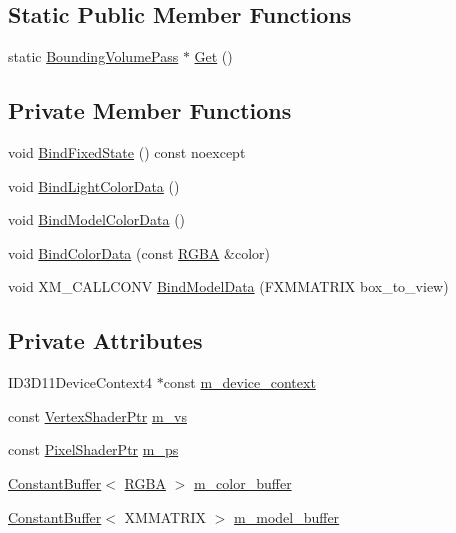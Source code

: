 \subsection*{Static Public Member Functions}
\begin{DoxyCompactItemize}
\item 
static \hyperlink{classmage_1_1_bounding_volume_pass}{Bounding\+Volume\+Pass} $\ast$ \hyperlink{classmage_1_1_bounding_volume_pass_a254c44c1c9f18967c9d6cdb6e53d3bcd}{Get} ()
\end{DoxyCompactItemize}
\subsection*{Private Member Functions}
\begin{DoxyCompactItemize}
\item 
void \hyperlink{classmage_1_1_bounding_volume_pass_ab38a107beb5481e923526d51e9fdfbe2}{Bind\+Fixed\+State} () const noexcept
\item 
void \hyperlink{classmage_1_1_bounding_volume_pass_a9dcca637d98ea8335777094d3d994f5c}{Bind\+Light\+Color\+Data} ()
\item 
void \hyperlink{classmage_1_1_bounding_volume_pass_af4591758a8dfa7cd19a0f87a0273e470}{Bind\+Model\+Color\+Data} ()
\item 
void \hyperlink{classmage_1_1_bounding_volume_pass_a29a98f857f8ae45a0230b96f78f2dcb9}{Bind\+Color\+Data} (const \hyperlink{structmage_1_1_r_g_b_a}{R\+G\+BA} \&color)
\item 
void X\+M\+\_\+\+C\+A\+L\+L\+C\+O\+NV \hyperlink{classmage_1_1_bounding_volume_pass_ae84dd1e056235a5fdbc7c496b6b99d1d}{Bind\+Model\+Data} (F\+X\+M\+M\+A\+T\+R\+IX box\+\_\+to\+\_\+view)
\end{DoxyCompactItemize}
\subsection*{Private Attributes}
\begin{DoxyCompactItemize}
\item 
I\+D3\+D11\+Device\+Context4 $\ast$const \hyperlink{classmage_1_1_bounding_volume_pass_a4ee95284ca70becba75d4be1a19268d7}{m\+\_\+device\+\_\+context}
\item 
const \hyperlink{namespacemage_a1f19b094f771e30bc0a6c1cebcc0dd58}{Vertex\+Shader\+Ptr} \hyperlink{classmage_1_1_bounding_volume_pass_a297862218108862e3435381613738322}{m\+\_\+vs}
\item 
const \hyperlink{namespacemage_acbec875bb5e5e085e32ed244a24d2b6f}{Pixel\+Shader\+Ptr} \hyperlink{classmage_1_1_bounding_volume_pass_a32ceb2fa35f36e66fe779eb738df8cfe}{m\+\_\+ps}
\item 
\hyperlink{classmage_1_1_constant_buffer}{Constant\+Buffer}$<$ \hyperlink{structmage_1_1_r_g_b_a}{R\+G\+BA} $>$ \hyperlink{classmage_1_1_bounding_volume_pass_aeb60ac6a87ba6fdd6a87fb750e2f3d10}{m\+\_\+color\+\_\+buffer}
\item 
\hyperlink{classmage_1_1_constant_buffer}{Constant\+Buffer}$<$ X\+M\+M\+A\+T\+R\+IX $>$ \hyperlink{classmage_1_1_bounding_volume_pass_a07df0f32726f390dd0f060bc6d61b40e}{m\+\_\+model\+\_\+buffer}
\end{DoxyCompactItemize}


